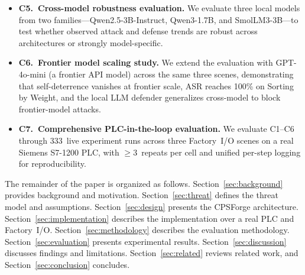 \begin{itemize}[leftmargin=1.5em]
    \item \textbf{C5.~Cross-model robustness evaluation.} We evaluate three local models from two families---Qwen2.5-3B-Instruct, Qwen3-1.7B, and SmolLM3-3B---to test whether observed attack and defense trends are robust across architectures or strongly model-specific.
    \item \textbf{C6.~Frontier model scaling study.} We extend the evaluation with GPT-4o-mini (a frontier API model) across the same three scenes, demonstrating that self-deterrence vanishes at frontier scale, ASR reaches 100\% on Sorting by Weight, and the local LLM defender generalizes cross-model to block frontier-model attacks.
    \item \textbf{C7.~Comprehensive PLC-in-the-loop evaluation.} We evaluate C1--C6 through 333~live experiment runs across three Factory~I/O scenes on a real Siemens S7-1200 PLC, with $\geq$3~repeats per cell and unified per-step logging for reproducibility.
\end{itemize}

The remainder of the paper is organized as follows. Section~\ref{sec:background} provides background and motivation. Section~\ref{sec:threat} defines the threat model and assumptions. Section~\ref{sec:design} presents the CPSForge architecture. Section~\ref{sec:implementation} describes the implementation over a real PLC and Factory~I/O. Section~\ref{sec:methodology} describes the evaluation methodology. Section~\ref{sec:evaluation} presents experimental results. Section~\ref{sec:discussion} discusses findings and limitations. Section~\ref{sec:related} reviews related work, and Section~\ref{sec:conclusion} concludes.
